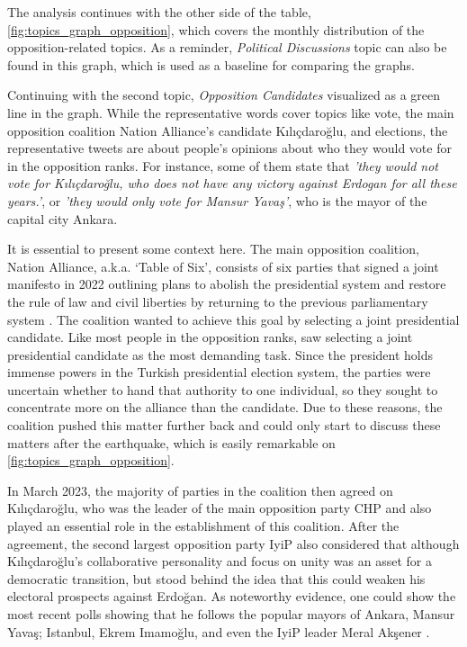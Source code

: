 The analysis continues with the other side of the table, \autoref{fig:topics_graph_opposition}, 
which covers the monthly distribution of the opposition-related topics. As a reminder, 
\textit{Political Discussions} topic can also be found in this graph, which is used as a baseline 
for comparing the graphs.

Continuing with the second topic, \textit{Opposition Candidates} visualized as a green line in the 
graph. While the representative words cover topics like vote, the main opposition coalition 
Nation Alliance's candidate Kılıçdaroğlu, and elections, the representative tweets are about 
people's opinions about who they would vote for in the opposition ranks. For instance, some of 
them state that \textit{'they would not vote for Kılıçdaroğlu, who does not have any victory 
against Erdogan for all these years.'}, or  \textit{'they would only vote for Mansur Yavaş'}, 
who is the mayor of the capital city Ankara. 

It is essential to present some context here. The main opposition coalition, Nation Alliance, 
a.k.a. `Table of Six', consists of six parties that signed a joint manifesto in 2022 outlining 
plans to abolish the presidential system and restore the rule of law and civil liberties by 
returning to the previous parliamentary system \parencite{berk_esen_opposition_alliance_2023}. 
The coalition wanted to achieve this goal by selecting a joint presidential candidate. 
Like most people in the opposition ranks, \parencite{berk_esen_opposition_alliance_2023} saw 
selecting a joint presidential candidate as the most demanding task. 
Since the president holds immense powers in the Turkish presidential election system, the parties 
were uncertain whether to hand that authority to one individual, so they sought to concentrate 
more on the alliance than the candidate. Due to these reasons, the coalition pushed this matter 
further back and could only start to discuss these matters after the earthquake, which is easily 
remarkable on \autoref{fig:topics_graph_opposition}. 

In March 2023, the majority of parties in the coalition then agreed on Kılıçdaroğlu, 
who was the leader of the main opposition party \ac{CHP} and also played an essential role in 
the establishment of this coalition. 
After the agreement, the second largest opposition party \ac{IyiP} also considered that although 
Kılıçdaroğlu's collaborative personality and focus on unity was an asset for a democratic 
transition, but stood behind the idea that this could weaken his electoral prospects against 
Erdo­ğan. As noteworthy evidence, one could show the most recent polls showing that he 
follows the popular mayors of Ankara, Mansur Yavaş; Istanbul, Ekrem Imamoğlu, and even the 
\ac{IyiP} leader Meral Akşener \parencite{berk_esen_opposition_alliance_2023}.

